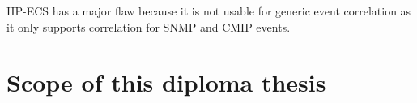 \documentclass[a4paper,titlepage,11pt,DIV10,BCOR0.5cm,headinclude]{article}
\begin{document}
HP-ECS has a major flaw because it is not usable for generic event correlation as it only supports correlation for SNMP and CMIP events.
\section{Scope of this diploma thesis}





\newpage


\end{document}

